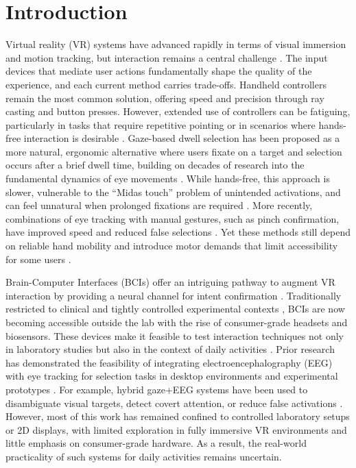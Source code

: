 \documentclass[utf8]{FrontiersinHarvard} %
\begin{document}
\section{Introduction}
Virtual reality (VR) systems have advanced rapidly in terms of visual immersion and motion tracking, but interaction remains a central challenge \citep{1011452,laviola2017book,101063}. The input devices that mediate user actions fundamentally shape the quality of the experience, and each current method carries trade-offs. Handheld controllers remain the most common solution, offering speed and precision through ray casting and button presses. However, extended use of controllers can be fatiguing, particularly in tasks that require repetitive pointing or in scenarios where hands-free interaction is desirable \citep{9419261}. Gaze-based dwell selection has been proposed as a more natural, ergonomic alternative \citep{9873986} where users fixate on a target and selection occurs after a brief dwell time, building on decades of research into the fundamental dynamics of eye movements \citep{101167,101001}. While hands-free, this approach is slower, vulnerable to the “Midas touch” problem \citep{Tang02062025} of unintended activations, and can feel unnatural when prolonged fixations are required \citep{8699248,isomoto,Chakraborty}. More recently, combinations of eye tracking with manual gestures, such as pinch confirmation, have improved speed and reduced false selections \citep{Zhang02072020,Vertegaal,Stellmach}. Yet these methods still depend on reliable hand mobility and introduce motor demands that limit accessibility for some users \citep{Gherman}. 

Brain-Computer Interfaces (BCIs) offer an intriguing pathway to augment VR interaction by providing a neural channel for intent confirmation \citep{Saxena}. Traditionally restricted to clinical and tightly controlled experimental contexts \citep{s19061423,s120201211}, BCIs are now becoming accessible outside the lab with the rise of consumer-grade headsets and biosensors. These devices make it feasible to test interaction techniques not only in laboratory studies but also in the context of daily activities \citep{Vasiljevic20012020,Pan2017EvaluationOC,a10795393}. Prior research has demonstrated the feasibility of integrating electroencephalography (EEG) with eye tracking for selection tasks in desktop environments and experimental prototypes \citep{Putze,Putze2,Hild}. For example, hybrid gaze+EEG systems have been used to disambiguate visual targets, detect covert attention, or reduce false activations \citep{Shishkin,kalaganis2018erroraware,Vortmann,evain}. However, most of this work has remained confined to controlled laboratory setups or 2D displays, with limited exploration in fully immersive VR environments \citep{larsen2024synchronized} and little emphasis on consumer-grade hardware. As a result, the real-world practicality of such systems for daily activities remains uncertain.
\end{document}
